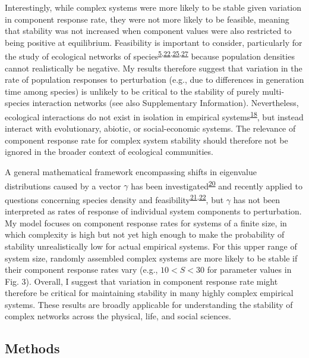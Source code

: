 \documentclass[]{article}
\begin{document}
Interestingly, while complex systems were more likely to be stable given
variation in component response rate, they were not more likely to be
feasible, meaning that stability was not increased when component values
were also restricted to being positive at equilibrium. Feasibility is
important to consider, particularly for the study of ecological networks
of
species\textsuperscript{\protect\hyperlink{ref-Grilli2017}{5},\protect\hyperlink{ref-Stone2017}{22},\protect\hyperlink{ref-Dougoud2018}{25},\protect\hyperlink{ref-Servan2018}{27}}
because population densities cannot realistically be negative. My
results therefore suggest that variation in the rate of population
responses to perturbation (e.g., due to differences in generation time
among species) is unlikely to be critical to the stability of purely
multi-species interaction networks (see also Supplementary Information).
Nevertheless, ecological interactions do not exist in isolation in
empirical
systems\textsuperscript{\protect\hyperlink{ref-Patel2018}{18}}, but
instead interact with evolutionary, abiotic, or social-economic systems.
The relevance of component response rate for complex system stability
should therefore not be ignored in the broader context of ecological
communities.

A general mathematical framework encompassing shifts in eigenvalue
distributions caused by a vector \(\gamma\) has been
investigated\textsuperscript{\protect\hyperlink{ref-Ahmadian2015}{20}}
and recently applied to questions concerning species density and
feasibility\textsuperscript{\protect\hyperlink{ref-Gibbs2017}{21},\protect\hyperlink{ref-Stone2017}{22}},
but \(\gamma\) has not been interpreted as rates of response of
individual system components to perturbation. My model focuses on
component response rates for systems of a finite size, in which
complexity is high but not yet high enough to make the probability of
stability unrealistically low for actual empirical systems. For this
upper range of system size, randomly assembled complex systems are more
likely to be stable if their component response rates vary (e.g.,
\(10 < S < 30\) for parameter values in Fig. 3). Overall, I suggest that
variation in component response rate might therefore be critical for
maintaining stability in many highly complex empirical systems. These
results are broadly applicable for understanding the stability of
complex networks across the physical, life, and social sciences.

\subsection{Methods}\label{methods}
\end{document}
